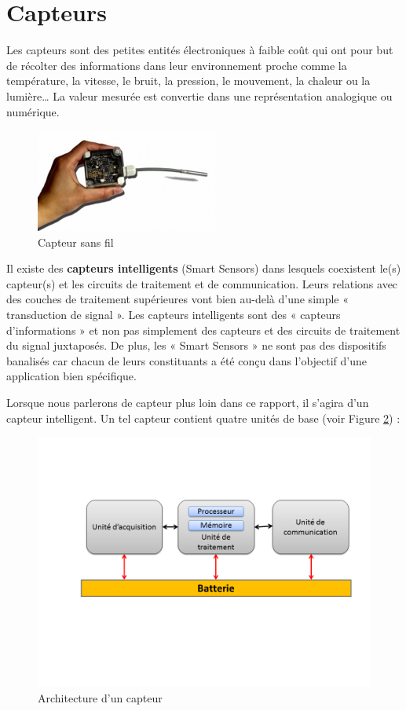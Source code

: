 \section{Capteurs}

Les capteurs sont des petites entités électroniques à faible coût qui ont pour but de récolter des informations dans leur environnement proche comme la température, la vitesse, le bruit, la pression, le mouvement, la chaleur ou la lumière… La valeur mesurée est convertie dans une représentation analogique ou numérique.

\begin{figure}[h]
\centering
\includegraphics[scale=0.8]{Intro/imageCapteur}
\caption{\label{imageCapteur} Capteur sans fil}
\end{figure}

Il existe des \textbf{capteurs intelligents} (Smart Sensors) dans lesquels coexistent le(s) capteur(s) et les circuits de traitement et de communication. Leurs relations avec des couches de traitement supérieures vont bien au-delà d’une simple « transduction de signal ». Les capteurs intelligents sont des « capteurs d’informations » et non pas simplement des capteurs et des circuits de traitement du signal juxtaposés. De plus, les « Smart Sensors » ne sont pas des dispositifs banalisés car chacun de leurs constituants a été conçu dans l’objectif d’une application bien spécifique.

Lorsque nous parlerons de capteur plus loin dans ce rapport, il s'agira d'un capteur intelligent. Un tel capteur contient quatre unités de base (voir Figure \ref{archiCapteur}) : 
 
 \begin{figure}[h]
\centering
\includegraphics[scale=0.6]{Intro/archiCapteur}
\caption{\label{archiCapteur} Architecture d’un capteur}
\end{figure}
 
